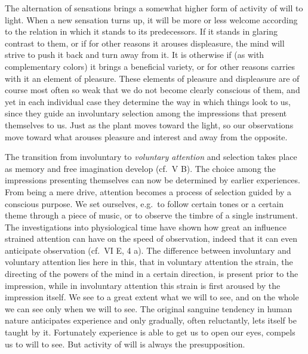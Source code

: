\documentclass[12pt,a4paper]{book}
\newcommand{\opage}[1]{\marginnote{\footnotesize\textit{[#1]}}}
\begin{document}
The alternation of sensations brings a somewhat higher form of activity
of will to light. When a new sensation turns up, it will be more or less
welcome according to the relation in which it stands to its
predecessors. If it stands in glaring contrast to them, or if for other
reasons it arouses displeasure, the mind will strive to push it back and
turn away from it. It is otherwise if (as with complementary colors) it
brings a beneficial variety, or for other reasons carries with it an
element of pleasure. These elements of pleasure and displeasure are of
course most often so weak that we do not become clearly conscious of
them, and yet in each individual case they determine the way in which
things look to us, since they guide an involuntary selection among the
impressions that present themselves to us. Just as the plant moves toward
the light, so our observations move toward what arouses pleasure and
interest and away from the opposite.

The transition from involuntary to \emph{voluntary attention} and
selection takes place as memory and free imagination develop (cf.\ V B).
The choice among the impressions presenting themselves can now be
determined by earlier experiences. From being a mere drive, attention
becomes a process of selection guided by a conscious purpose. We set
ourselves, e.g.\ to follow certain tones or a certain theme through a
piece of music, or to observe the timbre of a single instrument. The
investigations into physiological time have shown how great an influence
strained attention can
\opage{373}have on the speed of observation, indeed that it can even
anticipate observation (cf.\ VI E, 4 a). The difference between
involuntary and voluntary attention lies here in this, that in voluntary
attention the strain, the directing of the powers of the mind in a
certain direction, is present prior to the impression, while in
involuntary attention this strain is first aroused by the impression
itself. We see to a great extent what we will to see, and on the whole
we can see only when we will to see. The original sanguine tendency in
human nature anticipates experience and only gradually, often
reluctantly, lets itself be taught by it. Fortunately experience is able
to get us to open our eyes, compels us to will to see. But activity of
will is always the presupposition.
\end{document}
